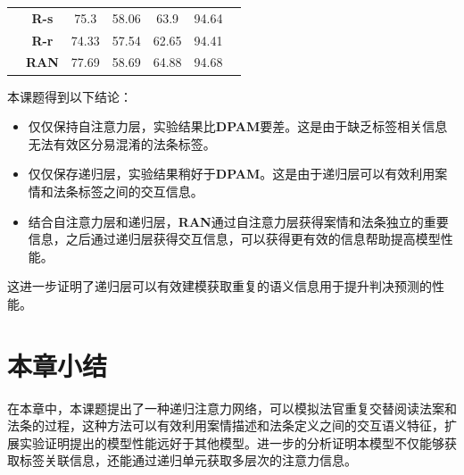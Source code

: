 \begin{table}[htbp]
\begin{tabular}{ccccccc}
                                                                                        & \textbf{R-s}    & 75.3        & 58.06 & 63.9   & 94.64       \\
                                                                                        & \textbf{R-r}    & 74.33       & 57.54 & 62.65  & 94.41       \\
                                                                                        & \textbf{RAN}    & 77.69       & 58.69 & 64.88  & 94.68       \\ \hline
        \end{tabular}
\end{table}

本课题得到以下结论：\
\begin{itemize}
    \item 仅仅保持自注意力层，实验结果比\textbf{DPAM}要差。这是由于缺乏标签相关信息无法有效区分易混淆的法条标签。
    \item 仅仅保存递归层，实验结果稍好于\textbf{DPAM}。这是由于递归层可以有效利用案情和法条标签之间的交互信息。
    \item 结合自注意力层和递归层，\textbf{RAN}通过自注意力层获得案情和法条独立的重要信息，之后通过递归层获得交互信息，可以获得更有效的信息帮助提高模型性能。
\end{itemize}
这进一步证明了递归层可以有效建模获取重复的语义信息用于提升判决预测的性能。
\section{本章小结}
\label{sec:ran_conclu}
在本章中，本课题提出了一种递归注意力网络，可以模拟法官重复交替阅读法案和法条的过程，这种方法可以有效利用案情描述和法条定义之间的交互语义特征，扩展实验证明提出的模型性能远好于其他模型。进一步的分析证明本模型不仅能够获取标签关联信息，还能通过递归单元获取多层次的注意力信息。

